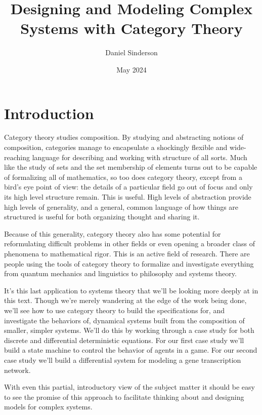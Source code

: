 \documentclass[12pt]{article}
\title{Designing and Modeling Complex Systems with Category Theory}
\author{Daniel Sinderson}
\date{May 2024}
\begin{document}
\maketitle


\section*{Introduction}
Category theory studies composition.
By studying and abstracting notions of composition, categories manage to encapsulate
a shockingly flexible and wide-reaching language for describing and working with structure of all sorts.
Much like the study of sets and the set membership of elements turns out to be capable of formalizing all of mathematics,
so too does category theory, except from a bird's eye point of view:
the details of a particular field go out of focus and only its high level structure remain.
This is useful.
High levels of abstraction provide high levels of generality,
and a general, common language of how things are structured is useful for both organizing thought and sharing it.

Because of this generality, category theory also has some potential for
reformulating difficult problems in other fields or even
opening a broader class of phenomena to mathematical rigor.
This is an active field of research.
There are people using the tools of category theory to formalize and investigate everything from quantum mechanics and linguistics to philosophy and systems theory.

It's this last application to systems theory that we'll be looking more deeply at in this text.
Though we're merely wandering at the edge of the work being done, we'll see how to use category theory to build the specifications for, and investigate the behaviors of, dynamical systems built from the composition of smaller, simpler systems.
We'll do this by working through a case study for both discrete and differential deterministic equations.
For our first case study we'll build a state machine to control the behavior of agents in a game.
For our second case study we'll build a differential system for modeling a gene transcription network.

With even this partial, introductory view of the subject matter
it should be easy to see the promise of this approach to facilitate thinking about
and designing models for complex systems.
\end{document}

